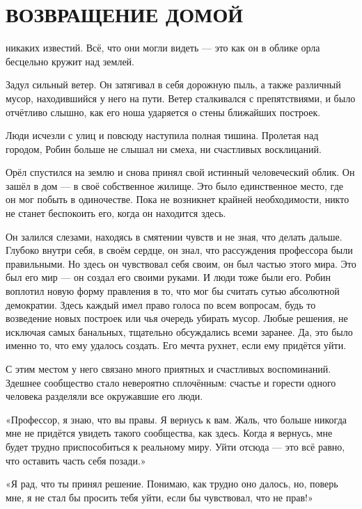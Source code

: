 \documentclass[a4paper,12pt]{book}
\begin{document}
\chapter{ВОЗВРАЩЕНИЕ ДОМОЙ}
\noindent{} никаких известий. Всё, что они могли видеть — это как он в облике орла бесцельно кружит над землей.
\par
Задул сильный ветер. Он затягивал в себя дорожную пыль, а также различный мусор, находившийся у него на пути. Ветер сталкивался с препятствиями, и было отчётливо слышно, как его ноша ударяется о стены ближайших построек.
\par
Люди исчезли с улиц и повсюду наступила полная тишина. Пролетая над городом, Робин больше не слышал ни смеха, ни счастливых восклицаний.
\par
Орёл спустился на землю и снова принял свой истинный человеческий облик. Он зашёл в дом — в своё собственное жилище. Это было единственное место, где он мог побыть в одиночестве. Пока не возникнет крайней необходимости, никто не станет беспокоить его, когда он находится здесь.
\par
Он залился слезами, находясь в смятении чувств и не зная, что делать дальше. Глубоко внутри себя, в своём сердце, он знал, что рассуждения профессора были правильными. Но здесь он чувствовал себя своим, он был частью этого мира. Это был его мир — он создал его своими руками. И люди тоже были его. Робин воплотил новую форму правления в то, что мог бы считать сутью абсолютной демократии. Здесь каждый имел право голоса по всем вопросам, будь то возведение новых построек или чья очередь убирать мусор. Любые решения, не исключая самых банальных, тщательно обсуждались всеми заранее. Да, это было именно то, что ему удалось создать. Его мечта рухнет, если ему придётся уйти.
\par
С этим местом у него связано много приятных и счастливых воспоминаний. Здешнее сообщество стало невероятно сплочённым: счастье и горести одного человека разделяли все окружавшие его люди.
\par
«Профессор, я знаю, что вы правы. Я вернусь к вам. Жаль, что больше никогда мне не придётся увидеть такого сообщества, как здесь. Когда я вернусь, мне будет трудно приспособиться к реальному миру. Уйти отсюда — это всё равно, что оставить часть себя позади.»
\par
«Я рад, что ты принял решение. Понимаю, как трудно оно далось, но, поверь мне, я не стал бы просить тебя уйти, если бы чувствовал, что не прав!»
\end{document}
